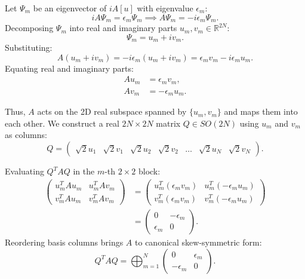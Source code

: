 \documentclass[11pt,a4paper]{article}
\begin{document}
Let $\Psi_m$ be an eigenvector of $iA[u]$ with eigenvalue $\epsilon_m$:
\begin{equation}
    i A \Psi_m = \epsilon_m \Psi_m \implies A \Psi_m = -i \epsilon_m \Psi_m.
\end{equation}
Decomposing $\Psi_m$ into real and imaginary parts $u_m, v_m \in \mathbb{R}^{2N}$:
\begin{equation}
    \Psi_m = u_m + i v_m.
\end{equation}
Substituting:
\begin{equation}
    A (u_m + i v_m) = -i \epsilon_m (u_m + i v_m) = \epsilon_m v_m - i \epsilon_m u_m.
\end{equation}
Equating real and imaginary parts:
\begin{align}
    A u_m &= \epsilon_m v_m, \\
    A v_m &= -\epsilon_m u_m.
\end{align}

Thus, $A$ acts on the 2D real subspace spanned by $\{u_m, v_m\}$ and maps them into each other.
We construct a real $2N \times 2N$ matrix $Q \in SO(2N)$ using $u_m$ and $v_m$ as columns:
\begin{equation}
    Q = \begin{pmatrix} \sqrt{2} u_1 & \sqrt{2} v_1 & \sqrt{2} u_2 & \sqrt{2} v_2 & \dots & \sqrt{2} u_N & \sqrt{2} v_N \end{pmatrix}.
\end{equation}

Evaluating $Q^T A Q$ in the $m$-th $2 \times 2$ block:
\begin{align}
    \begin{pmatrix} u_m^T A u_m & u_m^T A v_m \\ v_m^T A u_m & v_m^T A v_m \end{pmatrix} &= \begin{pmatrix} u_m^T (\epsilon_m v_m) & u_m^T (-\epsilon_m u_m) \\ v_m^T (\epsilon_m v_m) & v_m^T (-\epsilon_m u_m) \end{pmatrix} \nonumber \\
    &= \begin{pmatrix} 0 & -\epsilon_m \\ \epsilon_m & 0 \end{pmatrix}.
\end{align}
Reordering basis columns brings $A$ to canonical skew-symmetric form:
\begin{equation}
    Q^T A Q = \bigoplus_{m=1}^N \begin{pmatrix} 0 & \epsilon_m \\ -\epsilon_m & 0 \end{pmatrix}.
\end{equation}
\end{document}
